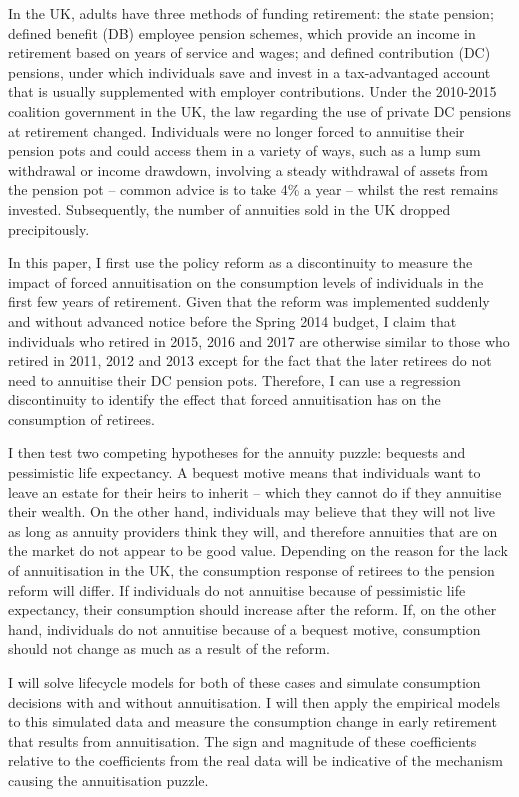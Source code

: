 \documentclass[12pt]{article}
\begin{document}
In the UK, adults have three methods of funding retirement: the state pension;
defined benefit (DB) employee pension schemes, which provide an income in
retirement based on years of service and wages; and defined
contribution (DC) pensions, under which individuals save and invest in a
tax-advantaged account that is usually supplemented with employer contributions.
Under the 2010-2015 coalition government in the UK, the law regarding the use of
private DC pensions at retirement changed. Individuals were no longer forced to
annuitise their pension pots and could access them in a variety of ways, such as
a lump sum withdrawal or income drawdown, involving a steady withdrawal of
assets from the pension pot -- common advice is to take 4\% a year -- whilst the
rest remains invested. Subsequently, the number of annuities sold in the UK
dropped precipitously.

In this paper, I first use the policy reform as a discontinuity to measure the
impact of forced annuitisation on the consumption levels of individuals in the
first few years of retirement. Given that the reform was implemented suddenly
and without advanced notice before the Spring 2014 budget, I claim that
individuals who retired in 2015, 2016 and 2017 are otherwise similar to those
who retired in 2011, 2012 and 2013 except for the fact that the later retirees
do not need to annuitise their DC pension pots. Therefore, I can use a
regression discontinuity to identify the effect that forced annuitisation has on
the consumption of retirees.

I then test two competing hypotheses for the annuity puzzle: bequests and
pessimistic life expectancy. A bequest motive means that individuals want to
leave an estate for their heirs to inherit -- which they cannot do if they
annuitise their wealth. On the other hand, individuals may believe that they
will not live as long as annuity providers think they will, and therefore
annuities that are on the market do not appear to be good value. Depending on
the reason for the lack of annuitisation in the UK, the consumption response of
retirees to the pension reform will differ. If individuals do not annuitise
because of pessimistic life expectancy, their consumption should increase after
the reform. If, on the other hand, individuals do not annuitise because of a
bequest motive, consumption should not change as much as a result of the reform.

I will solve lifecycle models for both of these cases and simulate consumption
decisions with and without annuitisation. I will then apply the empirical models
to this simulated data and measure the consumption change in early retirement
that results from annuitisation. The sign and magnitude of these coefficients
relative to the coefficients from the real data will be indicative of the
mechanism causing the annuitisation puzzle.
\end{document}
